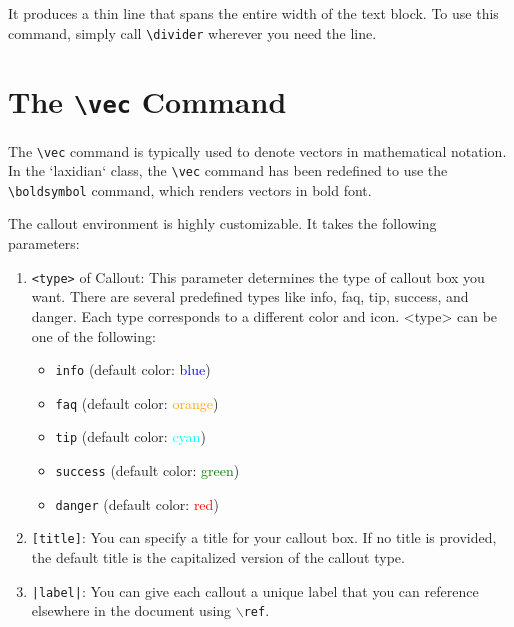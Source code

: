 \documentclass{laxidian}
\begin{document}
    It produces a thin line that spans the entire width of the text block. To use this command, simply call \texttt{\textbackslash divider} wherever you need the line.

    \divider

    \section{The \texttt{\textbackslash vec} Command}

    The \texttt{\textbackslash vec} command is typically used to denote vectors in mathematical notation. In the `laxidian` class, the \texttt{\textbackslash vec} command has been redefined to use the \texttt{\textbackslash boldsymbol} command, which renders vectors in bold font.

    The callout environment is highly customizable. It takes the following parameters:

    \begin{enumerate}

        \item \texttt{<type>} of Callout:
        This parameter determines the type of callout box you want. There are several predefined types like info, faq, tip, success, and danger. Each type corresponds to a different color and icon.
        <type> can be one of the following:
        \begin{itemize}

            \item \texttt{info} (default color: \textcolor{blue}{blue})

            \item \texttt{faq} (default color: \textcolor{orange}{orange})

            \item \texttt{tip} (default color: \textcolor{cyan}{cyan})

            \item \texttt{success} (default color: \textcolor{green}{green})

            \item \texttt{danger} (default color: \textcolor{red}{red})
        \end{itemize}

        \item \texttt{[title]}:
        You can specify a title for your callout box. If no title is provided, the default title is the capitalized version of the callout type.

        \item \texttt{|label|}:
        You can give each callout a unique label that you can reference elsewhere in the document using \texttt{$\backslash$ref}.

    \end{enumerate}
\end{document}
